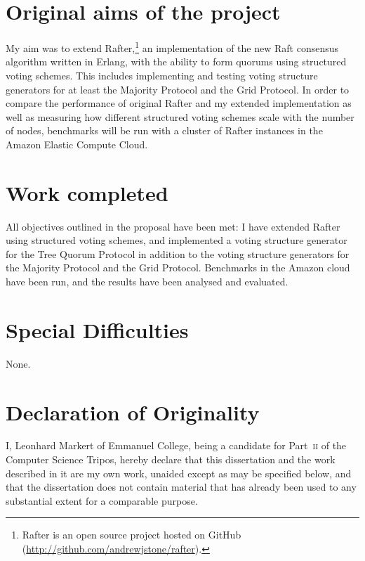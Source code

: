 \documentclass[11pt,chapterprefix=true,toc=bibliography,numbers=noendperiod,
               footnotes=multiple,twoside]{scrreprt}
\begin{document}
\section*{Original aims of the project\label{sc:original-aims}}

My aim was to extend Rafter,\footnote{Rafter is an open source project hosted on GitHub (\url{http://github.com/andrewjstone/rafter}).} an implementation of the new Raft \autocite{raft} consensus algorithm written in Erlang, with the ability to form quorums using structured voting schemes. This includes implementing and testing voting structure generators for at least the Majority Protocol and the Grid Protocol. In order to compare the performance of original Rafter and my extended implementation as well as measuring how different structured voting schemes scale with the number of nodes, benchmarks will be run with a cluster of Rafter instances in the Amazon Elastic Compute Cloud.

\section*{Work completed\label{sc:work-completed}}

All objectives outlined in the proposal have been met: I have extended Rafter using structured voting schemes, and implemented a voting structure generator for the Tree Quorum Protocol in addition to the voting structure generators for the Majority Protocol and the Grid Protocol. Benchmarks in the Amazon cloud have been run, and the results have been analysed and evaluated.

\section*{Special Difficulties\label{sc:special-difficulties}}

None.

\newpage

\section*{Declaration of Originality\label{sc:declaration-of-originality}}

I, Leonhard Markert of Emmanuel College, being a candidate for Part~\textsc{ii} of the Computer Science Tripos, hereby declare that this dissertation and the work described in it are my own work, unaided except as may be specified below, and that the dissertation does not contain material that has already been used to any substantial extent for a comparable purpose.
\end{document}
